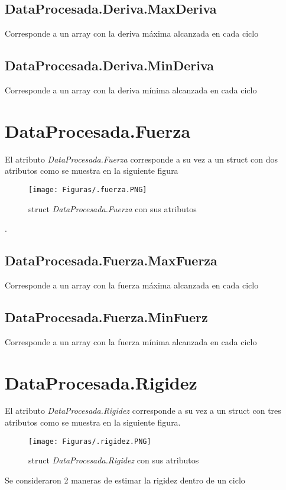 \documentclass[a4paper, 11pt,article,oneside]{memoir}%
\begin{document}
\section{DataProcesada.Deriva.MaxDeriva}
Corresponde a un array con la deriva máxima alcanzada en cada ciclo
\section{DataProcesada.Deriva.MinDeriva}
Corresponde a un array con la deriva mínima alcanzada en cada ciclo
\newpage
\chapter{DataProcesada.Fuerza}
El atributo \textit{DataProcesada.Fuerza} corresponde a su vez a un struct con dos atributos como se muestra en la siguiente figura
\begin{figure}[h!]
    \centering
    \texttt{[image: Figuras/.fuerza.PNG]}
    \caption{struct \textit{DataProcesada.Fuerza} con sus atributos}
    \label{fig:first resumen e3 }
\end{figure}.
\section{DataProcesada.Fuerza.MaxFuerza}
Corresponde a un array con la fuerza máxima alcanzada en cada ciclo
\section{DataProcesada.Fuerza.MinFuerz}
Corresponde a un array con la fuerza mínima alcanzada en cada ciclo
\newpage
\chapter{DataProcesada.Rigidez}
El atributo \textit{DataProcesada.Rigidez} corresponde a su vez a un struct con tres atributos como se muestra en la siguiente figura.\par
\begin{figure}[h!]
    \centering
    \texttt{[image: Figuras/.rigidez.PNG]}
    \caption{struct \textit{DataProcesada.Rigidez} con sus atributos}
    \label{fig:first resumen e4 }
\end{figure}
Se consideraron 2 maneras de estimar  la rigidez dentro de un ciclo
\end{document}
